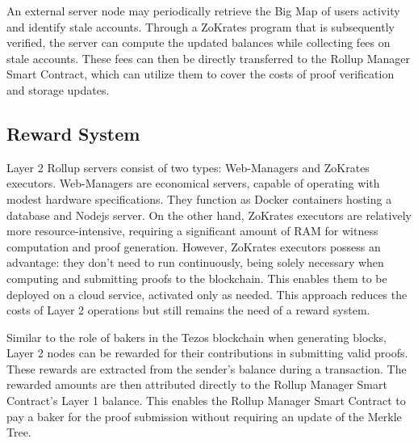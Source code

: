 An external server node may periodically retrieve the Big Map of users activity and identify stale accounts. Through a ZoKrates program that is subsequently verified, the server can compute the updated balances while collecting fees on stale accounts. These fees can then be directly transferred to the Rollup Manager Smart Contract, which can utilize them to cover the costs of proof verification and storage updates.

\subsection{Reward System}

Layer 2 Rollup servers consist of two types: Web-Managers and ZoKrates executors. Web-Managers are economical servers, capable of operating with modest hardware specifications. They function as Docker containers hosting a database and Nodejs server. On the other hand, ZoKrates executors are relatively more resource-intensive, requiring a significant amount of RAM for witness computation and proof generation. However, ZoKrates executors possess an advantage: they don't need to run continuously, being solely necessary when computing and submitting proofs to the blockchain. This enables them to be deployed on a cloud service, activated only as needed. This approach reduces the costs of Layer 2 operations but still remains the need of a reward system.

Similar to the role of bakers in the Tezos blockchain when generating blocks, Layer 2 nodes can be rewarded for their contributions in submitting valid proofs. These rewards are extracted from the sender's balance during a transaction. The rewarded amounts are then attributed directly to the Rollup Manager Smart Contract's Layer 1 balance. This enables the Rollup Manager Smart Contract to pay a baker for the proof submission without requiring an update of the Merkle Tree.